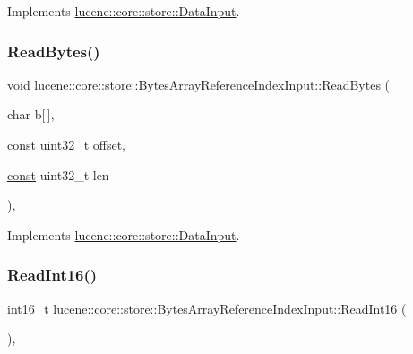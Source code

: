 Implements \mbox{\hyperlink{classlucene_1_1core_1_1store_1_1DataInput_a60f2550ccbe4decde30f3773dc53c0ef}{lucene\+::core\+::store\+::\+Data\+Input}}.

\mbox{\label{classlucene_1_1core_1_1store_1_1BytesArrayReferenceIndexInput_a944168ab1d79ae43706bbf333f4dea56}} 
\subsubsection{\texorpdfstring{Read\+Bytes()}{ReadBytes()}}
{\footnotesize\ttfamily void lucene\+::core\+::store\+::\+Bytes\+Array\+Reference\+Index\+Input\+::\+Read\+Bytes (\begin{DoxyParamCaption}\item[{char}]{b\mbox{[}$\,$\mbox{]},  }\item[{\mbox{\hyperlink{ZlibCrc32_8h_a2c212835823e3c54a8ab6d95c652660e}{const}} uint32\+\_\+t}]{offset,  }\item[{\mbox{\hyperlink{ZlibCrc32_8h_a2c212835823e3c54a8ab6d95c652660e}{const}} uint32\+\_\+t}]{len }\end{DoxyParamCaption})\hspace{0.3cm}{\ttfamily [inline]}, {\ttfamily [virtual]}}



Implements \mbox{\hyperlink{classlucene_1_1core_1_1store_1_1DataInput_aa5f24102b9b50a190bcb7a8edb82ea2d}{lucene\+::core\+::store\+::\+Data\+Input}}.

\mbox{\label{classlucene_1_1core_1_1store_1_1BytesArrayReferenceIndexInput_ab8c3794f54c8695921ccabdf0111ebed}} 
\subsubsection{\texorpdfstring{Read\+Int16()}{ReadInt16()}}
{\footnotesize\ttfamily int16\+\_\+t lucene\+::core\+::store\+::\+Bytes\+Array\+Reference\+Index\+Input\+::\+Read\+Int16 (\begin{DoxyParamCaption}{ }\end{DoxyParamCaption})\hspace{0.3cm}{\ttfamily [inline]}, {\ttfamily [virtual]}}



